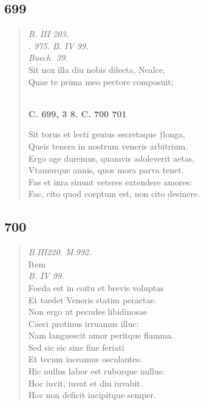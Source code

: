 \documentclass[11pt, a4paper]{report}
\begin{document}
            \subsection*{699}
      \begin{verse}
      \textit{B. III 203.} \\ \textit{. 975. B. IV 99.} \\ \textit{Buech. 39.} \\ Sit nox illa diu nobis dilecta, Nealce, \\ Quae te prima meo pectore composuit; \\ 
        ﻿\pagebreak 
    \begin{center} \textbf{C. 699, 3 8. C. 700 701} \end{center} \marginpar{[171]} Sit torus et lecti genius secretaque †longa, \\ Queis tenera in nostrum veneris arbitrium. \\ Ergo age duremus, quamvis adoleverit aetas, \\ Vtamurque annis, quos mora parva tenet. \\ Fas et inra sinunt veteres extendere amores: \\ Fac, cito quod coeptum est, non cito desinere. \\ 
      \end{verse}
  
            \subsection*{700}
      \begin{verse}
      \textit{B.III220. M.992.} \\  \lbrack Item \rbrack  \\ \textit{B. IV 99.} \\ Foeda est in coitu et brevis voluptas \\ Et taedet Veneris statim peractae. \\ Non ergo ut pecudes libidinosae \\ Caeci protinus irruamus illuc: \\ Nam languescit amor peritque flamma. \\ Sed sic sic sine fine feriati \\ Et tecum iaceamus osculantes. \\ Hic nullus labor est ruborque nullus: \\ Hoc iuvit, iuvat et diu iuvabit. \\ Hoc non deficit incipitque semper. \\ 
      \end{verse}
  
\end{document}
